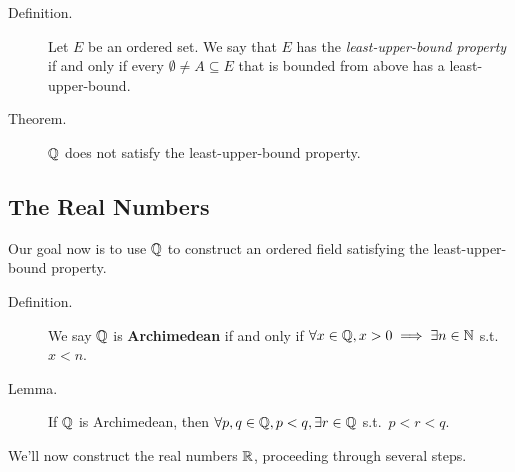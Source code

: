\documentclass[letterpaper,11pt]{article}
\begin{document}
\begin{description}
\item[Definition.] Let $E$ be an ordered set. We say that $E$ has the
    \textit{least-upper-bound property} if and only if every
    $\emptyset\ne A\subseteq E$ that is bounded from above has
    a least-upper-bound.
\item[Theorem.] $\mathbb{Q}$ does not satisfy the least-upper-bound property.
\end{description}

\subsection{The Real Numbers}
Our goal now is to use $\mathbb{Q}$ to construct an ordered field
satisfying the least-upper-bound property.
\begin{description}
\item[Definition.] We say $\mathbb{Q}$ is \textbf{Archimedean} if and only if
    $\forall x\in\mathbb{Q}, x>0\implies\exists n\in\mathbb{N}$ s.t.\ $x<n$.
\item[Lemma.] If $\mathbb{Q}$ is Archimedean, then $\forall p,q\in\mathbb{Q},p<q,
    \exists r\in\mathbb{Q}$ s.t.\ $p<r<q$.
\end{description}
We'll now construct the real numbers $\mathbb{R}$, proceeding through several steps.
\end{document}
